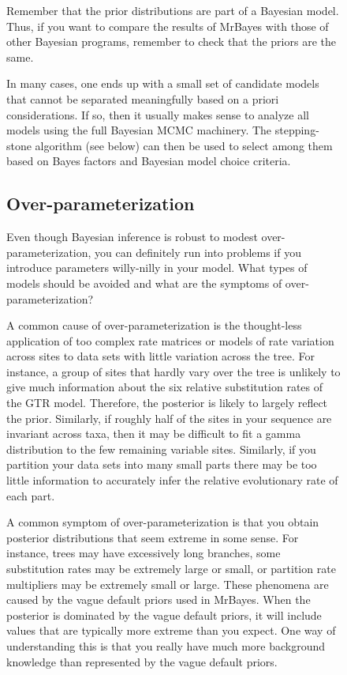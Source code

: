 \documentclass[12pt]{book}
\begin{document}
\begin{figure}[h]
Remember that the prior distributions are part of a Bayesian model. Thus, if you want to compare
the results of MrBayes with those of other Bayesian programs, remember to check that the priors are
the same.

In many cases, one ends up with a small set of candidate models that cannot be separated
meaningfully based on a priori considerations. If so, then it usually makes sense to analyze all
models using the full Bayesian MCMC machinery. The stepping-stone algorithm (see below) can then be
used to select among them based on Bayes factors and Bayesian model choice criteria.

\subsection{Over-parameterization}

Even though Bayesian inference is robust to modest over-parameterization, you can definitely run
into problems if you introduce parameters willy-nilly in your model. What types of models should be
avoided and what are the symptoms of over-parameterization?

A common cause of over-parameterization is the thought-less application of too complex rate
matrices or models of rate variation across sites to data sets with little variation across the
tree. For instance, a group of sites that hardly vary over the tree is unlikely to give much
information about the six relative substitution rates of the GTR model. Therefore, the posterior is
likely to largely reflect the prior. Similarly, if roughly half of the sites in your sequence are
invariant across taxa, then it may be difficult to fit a gamma distribution to the few remaining
variable sites. Similarly, if you partition your data sets into many small parts there may be too
little information to accurately infer the relative evolutionary rate of each part.

A common symptom of over-parameterization is that you obtain posterior distributions that seem
extreme in some sense. For instance, trees may have excessively long branches, some substitution
rates may be extremely large or small, or partition rate multipliers may be extremely small or
large. These phenomena are caused by the vague default priors used in MrBayes. When the posterior
is dominated by the vague default priors, it will include values that are typically more extreme
than you expect. One way of understanding this is that you really have much more background
knowledge than represented by the vague default priors.


\end{figure}
\end{document}

